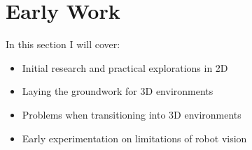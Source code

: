 \chapter{Early Work}\label{ch:early-work}
In this section I will cover:
  \begin{itemize}
    \item Initial research and practical explorations in 2D 
    \item Laying the groundwork for 3D environments
    \item Problems when transitioning into 3D environments
    \item Early experimentation on limitations of robot vision
  \end{itemize}


